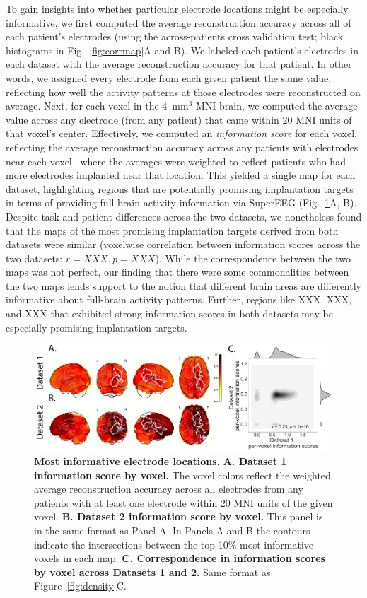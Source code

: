 \message{ !name(main.tex)}\documentclass[11pt]{article}
\begin{document}
{To gain insights into whether particular electrode locations might be
especially informative, we first computed the average reconstruction
accuracy across all of each patient's electrodes (using the
across-patients cross validation test; black histograms in
Fig.~\ref{fig:corrmap}A and B).  We labeled each patient's electrodes
in each dataset with the average reconstruction accuracy for that
patient.  In other words, we assigned every electrode from each given
patient the same value, reflecting how well the activity patterns at
those electrodes were reconstructed on average.  Next, for each voxel
in the 4~mm$^3$ MNI brain, we computed the average value across any
electrode (from any patient) that came within 20 MNI units of that
voxel's center.  Effectively, we computed an \textit{information
  score} for each voxel, reflecting the average reconstruction
accuracy across any patients with electrodes near each voxel-- where
the averages were weighted to reflect patients who had more electrodes
implanted near that location. This yielded a single map for each
dataset, highlighting regions that are potentially promising
implantation targets in terms of providing full-brain activity
information via SuperEEG (Fig.~\ref{fig:informap}A, B).  Despite task
and patient differences across the two datasets, we nonetheless found
that the maps of the most promising implantation targets derived from
both datasets were similar (voxelwise correlation between information
scores across the two datasets: $r = XXX, p = XXX$).  While the
correspondence between the two maps was not perfect, our finding that
there were some commonalities between the two maps lends support to
the notion that different brain areas are differently informative
about full-brain activity patterns.  Further, regions like XXX, XXX,
and XXX that exhibited strong information scores in both datasets may
be especially promising implantation targets.

\begin{figure}
  \centering
  \includegraphics[width=\textwidth]{figs/informap}
  \caption{\textbf{Most informative electrode locations.}
    \textbf{A. Dataset 1 information score by voxel.} The voxel colors
    reflect the weighted average reconstruction accuracy across all
    electrodes from any patients with at least one electrode within 20
    MNI units of the given voxel.  \textbf{B. Dataset 2 information
      score by voxel.}  This panel is in the same format as Panel A.
    In Panels A and B the contours indicate the intersections between
    the top 10\% most informative voxels in each map.
    \textbf{C. Correspondence in information scores by voxel across
      Datasets 1 and 2.}  Same format as Figure~\ref{fig:density}C.}
  \label{fig:informap}
\end{figure}

}
\end{document}

